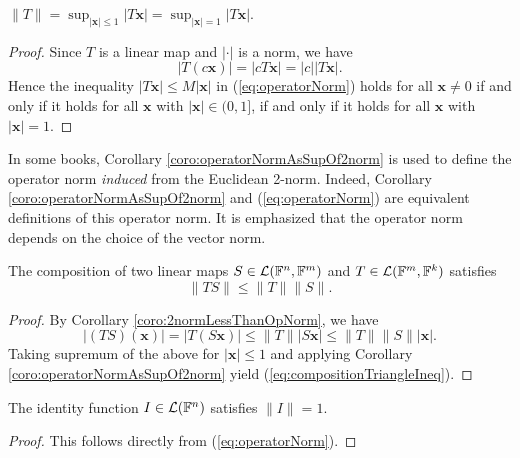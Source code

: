 \begin{coro}
  \label{coro:operatorNormAsSupOf2norm}
  $\|T\|=\sup_{|\mathbf{x}|\le 1} |T \mathbf{x}|
  = \sup_{|\mathbf{x}|=1} |T\mathbf{x}|$.
\end{coro}
\begin{proof}
  Since $T$ is a linear map
  and $|\cdot|$ is a norm,
  we have
  \begin{displaymath}
    |T(c\mathbf{x})|=|cT\mathbf{x}|=|c||T\mathbf{x}|.
  \end{displaymath}
  Hence the inequality $|T\mathbf{x}| \le M |\mathbf{x}|$
  in (\ref{eq:operatorNorm}) holds
  for all $\mathbf{x}\ne 0$
  if and only if it holds for all $\mathbf{x}$
  with $|\mathbf{x}|\in (0,1]$, 
  if and only if it holds for all $\mathbf{x}$
  with $|\mathbf{x}|=1$.
\end{proof}

\begin{rem}
  In some books, Corollary \ref{coro:operatorNormAsSupOf2norm}
  is used to define the operator norm
  \emph{induced} from the Euclidean 2-norm.
  Indeed, Corollary \ref{coro:operatorNormAsSupOf2norm}
  and (\ref{eq:operatorNorm})
  are equivalent definitions of this operator norm.
  It is emphasized that the operator norm
  depends on the choice of the vector norm.
\end{rem}

\begin{coro}
  \label{coro:compositionTriangleIneq}
  The composition of two linear maps
  \mbox{$S\in {\cal L}(\mathbb{F}^n,\mathbb{F}^m)$}
   and \mbox{$T\in {\cal L}(\mathbb{F}^m,\mathbb{F}^k)$}
  satisfies
  \begin{equation}
    \label{eq:compositionTriangleIneq}
    \|TS\| \le \|T\| \|S\|.
  \end{equation}
\end{coro}
\begin{proof}
  By Corollary \ref{coro:2normLessThanOpNorm}, we have
  \begin{displaymath}
    |(TS)(\mathbf{x})| = |T(S\mathbf{x})|
    \le \|T\||S\mathbf{x}| \le \|T\|\|S\||\mathbf{x}|.
  \end{displaymath}
  Taking supremum of the above for $|\mathbf{x}|\le 1$
  and applying Corollary \ref{coro:operatorNormAsSupOf2norm}
  yield (\ref{eq:compositionTriangleIneq}).
\end{proof}

\begin{coro}
  The identity function $I\in {\cal L}(\mathbb{F}^n)$
  satisfies $\|I\|=1$.
\end{coro}
\begin{proof}
  This follows directly from (\ref{eq:operatorNorm}).
\end{proof}

